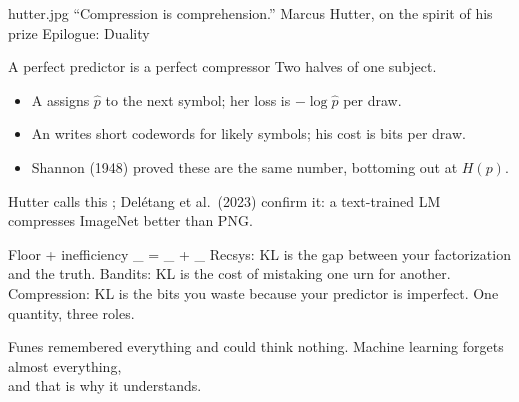 
\AINITepilogue

\sectiondividerwithportrait%
  {hutter.jpg}%
  {``Compression is comprehension.''}%
  {Marcus Hutter, on the spirit of his prize}%
  {Epilogue: Duality}

\begin{frame}[t]{A perfect predictor is a perfect compressor}
  Two halves of one subject.
  \begin{itemize}
    \item A  assigns $\hat p$ to the next symbol;
          her loss is $-\log \hat p$ per draw.
    \item An  writes short codewords for likely symbols;
          his cost is bits per draw.
    \item Shannon (1948) proved these are the same number, bottoming out at $H(p)$.
  \end{itemize}

  \smallskip
  Hutter calls this ; Del\'etang
  et al.\ (2023) confirm it: a text-trained LM compresses ImageNet better than PNG.
\end{frame}


\equationslide%
  {Floor + inefficiency}%
  {%
    _{}
    \;=\;
    _{}
    \;+\;
    _{}
  }%
  {Recsys: KL is the gap between your factorization and the truth.
   Bandits: KL is the cost of mistaking one urn for another.
   Compression: KL is the bits you waste because your predictor is imperfect.
   One quantity, three roles.}

\closingslide%
  {Funes remembered everything and could think nothing.}%
  {Machine learning forgets almost everything,\\and that is why it understands.}
